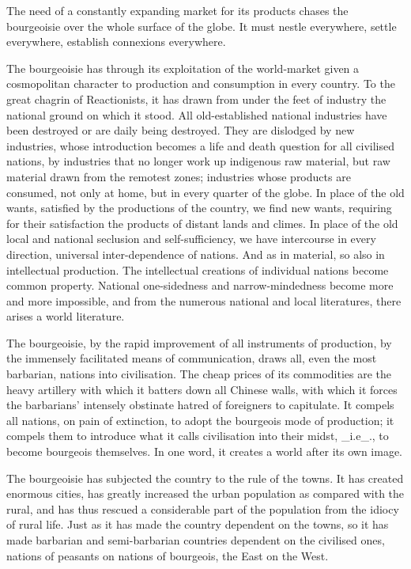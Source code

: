 The need of a constantly expanding market for its products chases the
bourgeoisie over the whole surface of the globe. It must nestle
everywhere, settle everywhere, establish connexions everywhere.

The bourgeoisie has through its exploitation of the world-market given
a cosmopolitan character to production and consumption in every
country. To the great chagrin of Reactionists, it has drawn from under
the feet of industry the national ground on which it stood. All
old-established national industries have been destroyed or are daily
being destroyed. They are dislodged by new industries, whose
introduction becomes a life and death question for all civilised
nations, by industries that no longer work up indigenous raw material,
but raw material drawn from the remotest zones; industries whose
products are consumed, not only at home, but in every quarter of the
globe. In place of the old wants, satisfied by the productions of the
country, we find new wants, requiring for their satisfaction the
products of distant lands and climes. In place of the old local and
national seclusion and self-sufficiency, we have intercourse in every
direction, universal inter-dependence of nations. And as in material,
so also in intellectual production. The intellectual creations of
individual nations become common property. National one-sidedness and
narrow-mindedness become more and more impossible, and from the
numerous national and local literatures, there arises a world
literature.

The bourgeoisie, by the rapid improvement of all instruments of
production, by the immensely facilitated means of communication, draws
all, even the most barbarian, nations into civilisation. The cheap
prices of its commodities are the heavy artillery with which it batters
down all Chinese walls, with which it forces the barbarians’ intensely
obstinate hatred of foreigners to capitulate. It compels all nations,
on pain of extinction, to adopt the bourgeois mode of production; it
compels them to introduce what it calls civilisation into their midst,
_i.e_., to become bourgeois themselves. In one word, it creates a world
after its own image.

The bourgeoisie has subjected the country to the rule of the towns. It
has created enormous cities, has greatly increased the urban population
as compared with the rural, and has thus rescued a considerable part of
the population from the idiocy of rural life. Just as it has made the
country dependent on the towns, so it has made barbarian and
semi-barbarian countries dependent on the civilised ones, nations of
peasants on nations of bourgeois, the East on the West.


